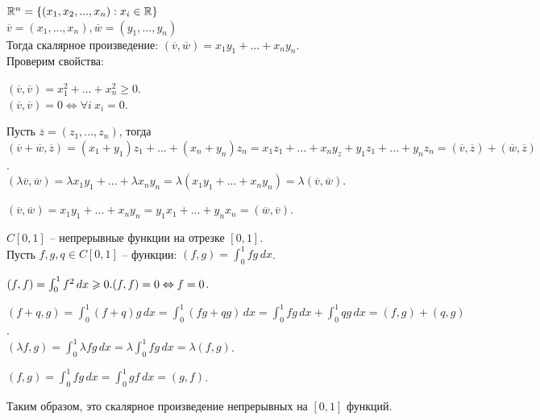 	\begin{Example}
	  $\mathbb{R}^n = \{ (x_1, x_2, ..., x_n): x_i \in \mathbb{R} \}$ \\
	  $\overline{v} = (x_1, ..., x_n), \overline{w} = (y_1, ..., y_n)$ \\
	  Тогда скалярное произведение: $(\overline{v}, \overline{w}) = x_1 y_1 + ... + x_n y_n.$ \\
	  Проверим свойства: 
	  \begin{MyList}
		\item $(\overline{v}, \overline{v}) = x_1^2 + ... + x_n^2 \geqslant 0$.\\
		$(\overline{v}, \overline{v}) = 0 \Leftrightarrow \forall i \ x_i = 0$.
		\item Пусть $ \overline{z} = (z_1, ..., z_n)$, тогда $(\overline{v} + \overline{w}, \overline{z}) = (x_1 + y_1)z_1 + ... + (x_n + y_n)z_n = x_1 z_1 + ... + x_n y_z + y_1 z_1 + ... + y_n z_n = (\overline{v}, \overline{z}) + (\overline{w}, \overline{z})$.\\
		$(\lambda \overline{v}, \overline{w}) = \lambda x_1 y_1 + ... + \lambda x_n y_n = \lambda (x_1 y_1 + ... + x_n y_n) = \lambda(\overline{v}, \overline{w})$.
		\item $(\overline{v}, \overline{w}) = x_1 y_1 + ... + x_n y_n = y_1 x_1 + ... + y_n x_n = (\overline{w}, \overline{v})$.
	  \end{MyList}
	\end{Example}
  
	\begin{Example}
	  $C[0, 1]$ -- непрерывные функции на отрезке $[0, 1]$.\\
	  Пусть $f, g, q \in C[0, 1]$ -- функции: $(f, g) = \int_0^1 fg \,dx$.
	  \begin{MyList}
		\item $(f, f) = \int_0^1 f^2 \,dx \geqslant 0. \\
		(f, f) = 0  \Leftrightarrow f = 0$.
		\item $(f + q, g) = \int_0^1 (f + q)g \,dx = \int_0^1 (fg + qg) \,dx = \int_0^1 fg \,dx + \int_0^1 qg \,dx = (f, g) + (q, g)$. \\
		$(\lambda f, g) =\int_0^1 \lambda fg \,dx  = \lambda \int_0^1 fg \,dx = \lambda(f, g)$.
		\item $(f, g) =\int_0^1 fg \,dx  = \int_0^1 gf \,dx = (g, f)$.
	  \end{MyList}
	  Таким образом, это скалярное произведение непрерывных на $[0, 1]$ функций.
	\end{Example}
  
